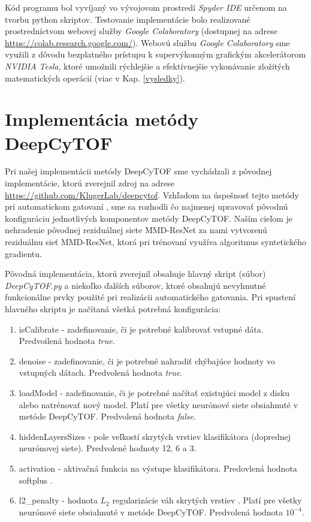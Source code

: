 Kód programu bol vyvíjaný vo vývojovom prostredí \textit{Spyder IDE} určenom na tvorbu python skriptov. Testovanie implementácie bolo realizované prostredníctvom webovej služby \textit{Google Colaboratory} (dostupnej na adrese \url{https://colab.research.google.com/}). Webovú službu \textit{Google Colaboratory} sme využili z dôvodu bezplatného prístupu k supervýkonným grafickým akcelerátorom \textit{NVIDIA Tesla}, ktoré umožnili rýchlejšie a efektívnejšie vykonávanie zložitých matematických operácií (viac v Kap. \ref{vysledky}). 

\section{Implementácia metódy DeepCyTOF}
\label{impl_deepcytof}

Pri našej implementácii metódy DeepCyTOF sme vychádzali z pôvodnej implementácie, ktorú zverejnil zdroj \cite{Li2017} na adrese \url{https://github.com/KlugerLab/deepcytof}. Vzhľadom na úspešnosť tejto metódy pri automatickom gatovaní \cite{Li2016, Li2017}, sme sa rozhodli čo najmenej upravovať pôvodnú konfiguráciu jednotlivých komponentov metódy DeepCyTOF. Naším cieľom je nehradenie pôvodnej reziduálnej siete MMD-ResNet za nami vytvorenú reziduálnu sieť MMD-ResNet, ktorá pri trénovaní využíva algoritmus syntetického gradientu.

Pôvodná implementácia, ktorú zverejnil \cite{Li2017} obsahuje hlavný skript (súbor) \textit{DeepCyTOF.py} a niekoľko ďalších súborov, ktoré obsahujú nevyhnutné funkcionálne prvky použité pri realizácii automatického gatovania. Pri spustení hlavného skriptu je načítaná všetká potrebná konfigurácia:
\begin{enumerate}
    \item isCalibrate - zadefinovanie, či je potrebné kalibrovať vstupné dáta. Predvoilená hodnota \textit{true}.
    \item denoise - zadefinovanie, či je potrebné nahradiť chýbajúce hodnoty vo vstupných dátach. Predvolená hodnota \textit{true}.
    \item loadModel - zadefinovanie, či je potrebné načítať existujúci model z disku alebo natrénovať nový model. Platí pre všetky neurónové siete obsiahnuté v metóde DeepCyTOF. Predvolená hodnota \textit{false}.
    \item hiddenLayersSizes - pole veľkostí skrytých vrstiev klasifikátora (doprednej neurónovej siete). Predvolené hodnoty 12, 6 a 3.
    \item activation - aktivačná funkcia na výstupe klasifikátora. Predovlená hodnota softplus \cite{Goh1995}.
    \item l2\_penalty - hodnota \textit{$L_2$} regularizácie váh skrytých vrstiev \cite{Goh1995}. Platí pre všetky neurónové siete obsiahnuté v metóde DeepCyTOF. Predvolená hodnota $10^{-4}$.
\end{enumerate}

